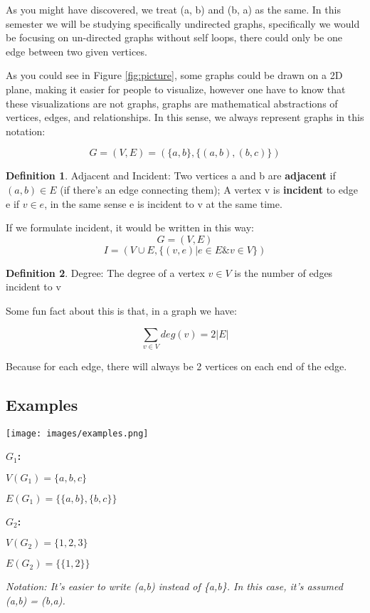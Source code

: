 \documentclass{article}
\theoremstyle{definition}
\newtheorem{definition}{Definition}
\theoremstyle{remark}
\begin{document}
As you might have discovered, we treat (a, b) and (b, a) as the same. In this semester we will be studying specifically undirected graphs, specifically we would be focusing on un-directed graphs without self loops, there could only be one edge between two given vertices.

\pagebreak

As you could see in Figure \ref{fig:picture}, some graphs could be drawn on a 2D plane, making it easier for people to visualize, however one have to know that these visualizations are not graphs, graphs are mathematical abstractions of vertices, edges, and relationships. In this sense, we always represent graphs in this notation:

$$G = (V,E) = (\{a, b\}, \{(a, b), (b, c)\})$$

\begin{definition}{Adjacent and Incident:}
Two vertices a and b are \textbf{adjacent} if $(a, b) \in E$ (if there's an edge connecting them); A vertex v is \textbf{incident} to edge e if $v \in e$, in the same sense e is incident to v at the same time.
\end{definition}
If we formulate incident, it would be written in this way: 
$$G = (V, E)$$
$$I = (V \cup E, \{ (v,e) | e \in E \& v \in V\})$$

\begin{definition}{Degree:}
The degree of a vertex $v \in V$ is the number of edges incident to v
\end{definition}

Some fun fact about this is that, in a graph we have:

$$\sum_{v \in V} deg(v) = 2|E|$$

Because for each edge, there will always be 2 vertices on each end of the edge.

\subsection{Examples}
\texttt{[image: images/examples.png]}

\textbf{$G_1$:}

$V(G_1) = \{a,b,c\}$

$E(G_1) = \{\{a,b\},\{b,c\}\}$

\textbf{$G_2$:}

$V(G_2) = \{1,2,3\}$

$E(G_2) = \{\{1,2\}\}$

\textit{Notation: It's easier to write (a,b) instead of \{a,b\}. In this case, it's assumed (a,b) = (b,a). }
\end{document}
